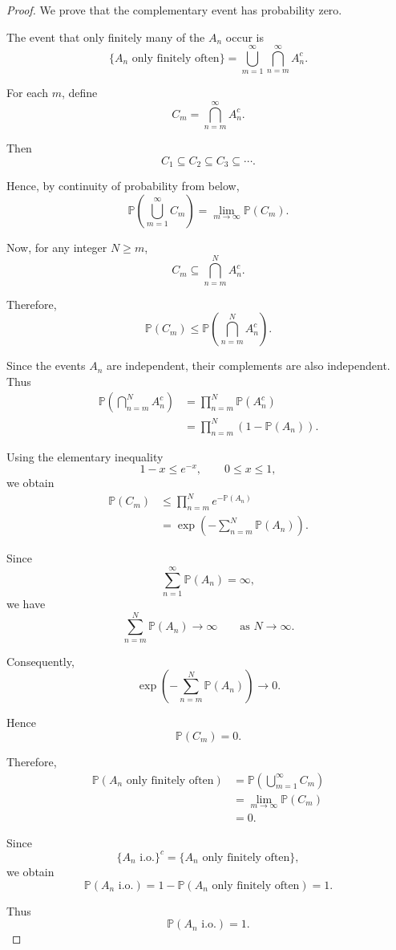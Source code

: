 \begin{proof}

We prove that the complementary event has probability zero.

The event that only finitely many of the $A_n$ occur is
\[
\{A_n\text{ only finitely often}\}
=
\bigcup_{m=1}^{\infty}
\bigcap_{n=m}^{\infty}A_n^c.
\]

For each $m$, define
\[
C_m
=
\bigcap_{n=m}^{\infty}A_n^c.
\]

Then
\[
C_1\subseteq C_2\subseteq C_3\subseteq\cdots.
\]

Hence, by continuity of probability from below,
\[
\mathbb{P}
\left(
\bigcup_{m=1}^{\infty}C_m
\right)
=
\lim_{m\to\infty}\mathbb{P}(C_m).
\]

Now, for any integer $N\geq m$,
\[
C_m
\subseteq
\bigcap_{n=m}^{N}A_n^c.
\]

Therefore,
\[
\mathbb{P}(C_m)
\leq
\mathbb{P}
\left(
\bigcap_{n=m}^{N}A_n^c
\right).
\]

Since the events $A_n$ are independent, their complements are also
independent. Thus
\[
\begin{aligned}
\mathbb{P}
\left(
\bigcap_{n=m}^{N}A_n^c
\right)
&=
\prod_{n=m}^{N}
\mathbb{P}(A_n^c)\\
&=
\prod_{n=m}^{N}
\left(1-\mathbb{P}(A_n)\right).
\end{aligned}
\]

Using the elementary inequality
\[
1-x\leq e^{-x},
\qquad
0\leq x\leq1,
\]
we obtain
\[
\begin{aligned}
\mathbb{P}(C_m)
&\leq
\prod_{n=m}^{N}
e^{-\mathbb{P}(A_n)}\\
&=
\exp
\left(
-\sum_{n=m}^{N}\mathbb{P}(A_n)
\right).
\end{aligned}
\]

Since
\[
\sum_{n=1}^{\infty}\mathbb{P}(A_n)=\infty,
\]
we have
\[
\sum_{n=m}^{N}\mathbb{P}(A_n)
\longrightarrow\infty
\qquad
\text{as }N\to\infty.
\]

Consequently,
\[
\exp
\left(
-\sum_{n=m}^{N}\mathbb{P}(A_n)
\right)
\longrightarrow0.
\]

Hence
\[
\mathbb{P}(C_m)=0.
\]

Therefore,
\[
\begin{aligned}
\mathbb{P}
(A_n\text{ only finitely often})
&=
\mathbb{P}
\left(
\bigcup_{m=1}^{\infty}C_m
\right)\\
&=
\lim_{m\to\infty}\mathbb{P}(C_m)\\
&=0.
\end{aligned}
\]

Since
\[
\{A_n\text{ i.o.}\}^c
=
\{A_n\text{ only finitely often}\},
\]
we obtain
\[
\mathbb{P}(A_n\text{ i.o.})
=
1-
\mathbb{P}(A_n\text{ only finitely often})
=
1.
\]

Thus
\[
\boxed{
\mathbb{P}(A_n\text{ i.o.})=1.
}
\]

\end{proof}



